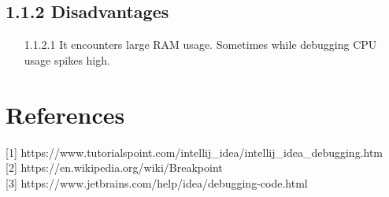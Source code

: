 \documentclass[10pt]{article}
\begin{document}
\subsection*{\large 1.1.2 Disadvantages}
\begin{description}
\begin{itemize}
\item [1.1.2.1]It encounters large RAM usage. Sometimes while debugging CPU usage spikes high. 
\end{itemize}
\end{description}
\newpage
\section{References}
{[1]} https://www.tutorialspoint.com/intellij\_idea/intellij\_idea\_debugging.htm\\
{[2]} https://en.wikipedia.org/wiki/Breakpoint\\
{[3]} https://www.jetbrains.com/help/idea/debugging-code.html\\
\end{document}
